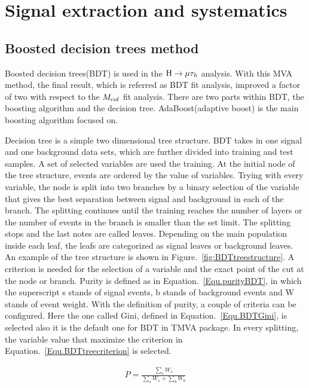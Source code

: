 
\chapter{Signal extraction and systematics}

\section{Boosted decision trees method} \label{BDTchaper}
Boosted decision trees(BDT) is used in the $\mathrm{H}\to \mu\tau_{h}$ analysis. With this MVA method, the final result, which is referred as BDT fit analysis, improved a factor of two with respect to the $M_{col}$ fit analysis. There are two parts within BDT, the boosting algorithm and the decision tree. AdaBoost(adaptive boost) is the main boosting algorithm focused on. 

Decision tree is a simple two dimensional tree structure. BDT takes in one signal and one background data sets, which are further divided into training and test samples. A set of selected variables are used the training. At the initial node of the tree structure, events are ordered by the value of variables. Trying with every variable, the node is split into two branches by a binary selection of the variable that gives the best separation between signal and background in each of the branch. The splitting continues until the training reaches the number of layers or the number of events in the branch is smaller than the set limit. The splitting stops and the last notes are called leaves. Depending on the main population inside each leaf, the leafs are categorized as signal leaves or background leaves. An example of the tree structure is shown in Figure.~\ref{fig:BDTtreestructure}.  A criterion is needed for the selection of a variable and the exact point of the cut at the node or branch. Purity is defined as in Equation.~\ref{Equ.purityBDT}, in which the superscript s stands of signal events, b stands of background events and W stands of event weight. With the definition of purity, a couple of criteria can be configured. Here the one called Gini, defined in Equation.~\ref{Equ.BDTGini}, is selected also it is the default one for BDT in TMVA package. In every splitting, the variable value that maximize the criterion in Equation.~\ref{Equ.BDTtreecriterion} is selected.  


\begin{align} \label{Equ.purityBDT}
P=\frac{\sum_{s}W_{s}}{\sum_{s}W_{s}+\sum_{b}W_{b}}
\end{align}

